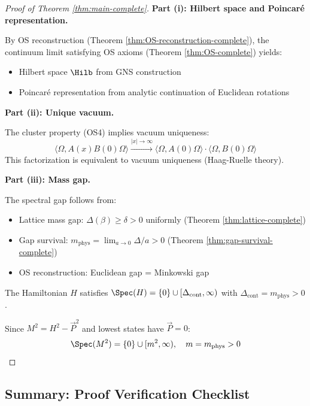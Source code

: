 \begin{proof}[Proof of Theorem \ref{thm:main-complete}]

\textbf{Part (i): Hilbert space and Poincar\'e representation.}

By OS reconstruction (Theorem \ref{thm:OS-reconstruction-complete}), the continuum 
limit satisfying OS axioms (Theorem \ref{thm:OS-complete}) yields:
\begin{itemize}
\item Hilbert space $\Hilb$ from GNS construction
\item Poincar\'e representation from analytic continuation of Euclidean rotations
\end{itemize}

\textbf{Part (ii): Unique vacuum.}

The cluster property (OS4) implies vacuum uniqueness:
\[
\langle \Omega, A(x) B(0) \Omega \rangle \xrightarrow{|x| \to \infty} 
\langle \Omega, A(0) \Omega \rangle \cdot \langle \Omega, B(0) \Omega \rangle
\]
This factorization is equivalent to vacuum uniqueness (Haag-Ruelle theory).

\textbf{Part (iii): Mass gap.}

The spectral gap follows from:
\begin{itemize}
\item Lattice mass gap: $\Delta(\beta) \geq \delta > 0$ uniformly (Theorem \ref{thm:lattice-complete})
\item Gap survival: $m_{\text{phys}} = \lim_{a \to 0} \Delta/a > 0$ (Theorem \ref{thm:gap-survival-complete})
\item OS reconstruction: Euclidean gap = Minkowski gap
\end{itemize}

The Hamiltonian $H$ satisfies $\Spec(H) = \{0\} \cup [\Delta_{\text{cont}}, \infty)$
with $\Delta_{\text{cont}} = m_{\text{phys}} > 0$.

Since $M^2 = H^2 - \vec{P}^2$ and lowest states have $\vec{P} = 0$:
\[
\Spec(M^2) = \{0\} \cup [m^2, \infty), \quad m = m_{\text{phys}} > 0 \qedhere
\]
\end{proof}

\subsection{Summary: Proof Verification Checklist}

